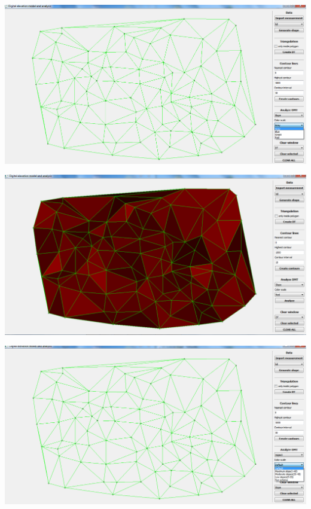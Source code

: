 \documentclass[12pt]{article}
\begin{document}
\begin{center}
   \includegraphics[width=14cm]{./img/slope_stupnice.png}
\end{center}

\begin{center}
   \includegraphics[width=14cm]{./img/slope_1_random_points.png}
\end{center}

\begin{center}
   \includegraphics[width=14cm]{./img/aspect_stupnice.png}
\end{center}
\end{document}
